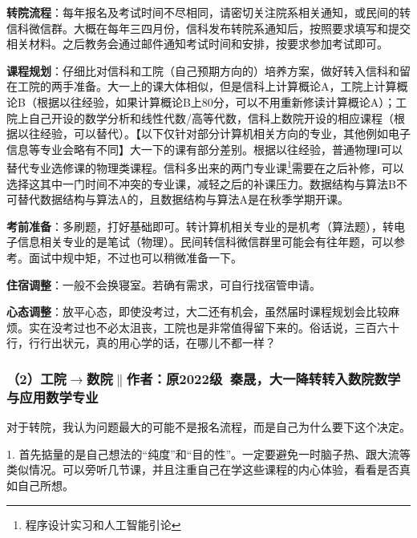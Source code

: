 \documentclass[11pt,oneside]{book}
\begin{document}
\vspace{10pt}

\textbf{转院流程}：每年报名及考试时间不尽相同，请密切关注院系相关通知，或民间的转信科微信群。大概在每年三四月份，信科发布转院系通知后，按照要求填写和提交相关材料。之后教务会通过邮件通知考试时间和安排，按要求参加考试即可。

\vspace{10pt}

\textbf{课程规划}：仔细比对信科和工院（自己预期方向的）培养方案，做好转入信科和留在工院的两手准备。大一上的课大体相似，但是信科上计算概论A，工院上计算概论B（根据以往经验，如果计算概论B上80分，可以不用重新修读计算概论A）；工院上自己开设的数学分析和线性代数/高等代数，信科上数院开设的相应课程（根据以往经验，可以替代）。【以下仅针对部分计算机相关方向的专业，其他例如电子信息等专业会略有不同】大一下的课有部分差别。根据以往经验，普通物理Ⅰ可以替代专业选修课的物理类课程。信科多出来的两门专业课\footnote{程序设计实习和人工智能引论}需要在之后补修，可以选择这其中一门时间不冲突的专业课，减轻之后的补课压力。数据结构与算法B不可替代数据结构与算法A的，且数据结构与算法A是在秋季学期开课。

\vspace{10pt}

\textbf{考前准备}：多刷题，打好基础即可。转计算机相关专业的是机考（算法题），转电子信息相关专业的是笔试（物理）。民间转信科微信群里可能会有往年题，可以参考。面试中规中矩，不过也可以稍微准备一下。

\vspace{10pt}

\textbf{住宿调整}：一般不会换寝室。若确有需求，可自行找宿管申请。

\vspace{10pt}

\textbf{心态调整}：放平心态，即使没考过，大二还有机会，虽然届时课程规划会比较麻烦。实在没考过也不必太沮丧，工院也是非常值得留下来的。俗话说，三百六十行，行行出状元，真的用心学的话，在哪儿不都一样？

\subsubsection{（2）工院$\to$数院$\parallel$作者：原2022级\ 秦晟，大一降转转入数院数学与应用数学专业}
对于转院，我认为问题最大的可能不是报名流程，而是自己为什么要下这个决定。

\vspace{10pt}

1. 首先掂量的是自己想法的“纯度”和“目的性”。一定要避免一时脑子热、跟大流等类似情况。可以旁听几节课，并且注重自己在学这些课程的内心体验，看看是否真如自己所想。
\end{document}
